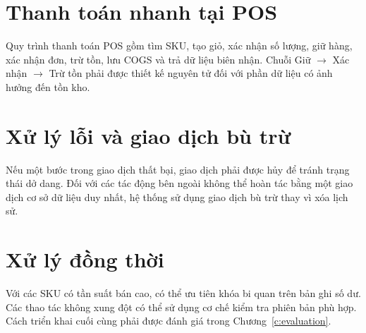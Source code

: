 \section{Thanh toán nhanh tại POS}

Quy trình thanh toán POS gồm tìm SKU, tạo giỏ, xác nhận số lượng, giữ hàng, xác nhận đơn,
trừ tồn, lưu COGS và trả dữ liệu biên nhận. Chuỗi Giữ $\rightarrow$ Xác nhận $\rightarrow$
Trừ tồn phải được thiết kế nguyên tử đối với phần dữ liệu có ảnh hưởng đến tồn kho.

\section{Xử lý lỗi và giao dịch bù trừ}

Nếu một bước trong giao dịch thất bại, giao dịch phải được hủy để tránh trạng thái dở dang.
Đối với các tác động bên ngoài không thể hoàn tác bằng một giao dịch cơ sở dữ liệu duy nhất,
hệ thống sử dụng giao dịch bù trừ thay vì xóa lịch sử.

\section{Xử lý đồng thời}

Với các SKU có tần suất bán cao, có thể ưu tiên khóa bi quan trên bản ghi số dư. Các thao tác
không xung đột có thể sử dụng cơ chế kiểm tra phiên bản phù hợp. Cách triển khai cuối cùng phải
được đánh giá trong Chương~\ref{c:evaluation}.
